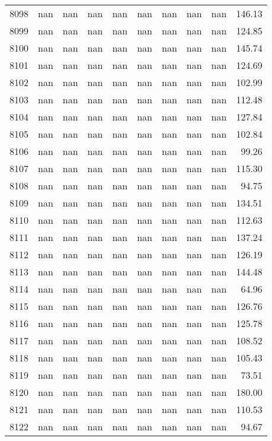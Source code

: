 \begin{tabular}{lrrrrrrrrr}
8098 & nan & nan & nan & nan & nan & nan & nan & nan & 146.13 \\
8099 & nan & nan & nan & nan & nan & nan & nan & nan & 124.85 \\
8100 & nan & nan & nan & nan & nan & nan & nan & nan & 145.74 \\
8101 & nan & nan & nan & nan & nan & nan & nan & nan & 124.69 \\
8102 & nan & nan & nan & nan & nan & nan & nan & nan & 102.99 \\
8103 & nan & nan & nan & nan & nan & nan & nan & nan & 112.48 \\
8104 & nan & nan & nan & nan & nan & nan & nan & nan & 127.84 \\
8105 & nan & nan & nan & nan & nan & nan & nan & nan & 102.84 \\
8106 & nan & nan & nan & nan & nan & nan & nan & nan & 99.26 \\
8107 & nan & nan & nan & nan & nan & nan & nan & nan & 115.30 \\
8108 & nan & nan & nan & nan & nan & nan & nan & nan & 94.75 \\
8109 & nan & nan & nan & nan & nan & nan & nan & nan & 134.51 \\
8110 & nan & nan & nan & nan & nan & nan & nan & nan & 112.63 \\
8111 & nan & nan & nan & nan & nan & nan & nan & nan & 137.24 \\
8112 & nan & nan & nan & nan & nan & nan & nan & nan & 126.19 \\
8113 & nan & nan & nan & nan & nan & nan & nan & nan & 144.48 \\
8114 & nan & nan & nan & nan & nan & nan & nan & nan & 64.96 \\
8115 & nan & nan & nan & nan & nan & nan & nan & nan & 126.76 \\
8116 & nan & nan & nan & nan & nan & nan & nan & nan & 125.78 \\
8117 & nan & nan & nan & nan & nan & nan & nan & nan & 108.52 \\
8118 & nan & nan & nan & nan & nan & nan & nan & nan & 105.43 \\
8119 & nan & nan & nan & nan & nan & nan & nan & nan & 73.51 \\
8120 & nan & nan & nan & nan & nan & nan & nan & nan & 180.00 \\
8121 & nan & nan & nan & nan & nan & nan & nan & nan & 110.53 \\
8122 & nan & nan & nan & nan & nan & nan & nan & nan & 94.67 \\

\end{tabular}
